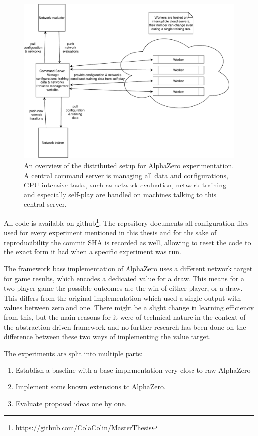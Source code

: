 \documentclass[12pt,onecolumn,oneside,titlepage]{article}
\begin{document}
\begin{figure}[H]
\centering
\includegraphics[clip,width=\columnwidth]{x0_framework_overview}
\caption{An overview of the distributed setup for AlphaZero experimentation. A central command server is managing all data and configurations, GPU intensive tasks, such as network evaluation, network training and especially self-play are handled on machines talking to this central server.}
\label{fig:x0_framework_overview}
\end{figure}

All code is available on github\footnote{\url{https://github.com/ColaColin/MasterThesis}}. The repository documents all configuration files used for every experiment mentioned in this thesis and 
for the sake of reproducibility the commit SHA is recorded as well, allowing to reset the code to the exact form it had when a specific experiment was run.

The framework base implementation of AlphaZero uses a different network target for game results, which encodes a dedicated value for a draw. This means for a two player game the possible outcomes are the win of either player, or a draw.
This differs from the original implementation which used a single output with values between zero and one.
There might be a slight change in learning efficiency from this, but the main reasons for it were of technical nature in the context of the abstraction-driven framework and no further research has been done on the difference between these two ways of implementing the value target.

The experiments are split into multiple parts:
\begin{enumerate}
 \item Establish a baseline with a base implementation very close to raw AlphaZero
 \item Implement some known extensions to AlphaZero.
 \item Evaluate proposed ideas one by one.
\end{enumerate}
\end{document}
